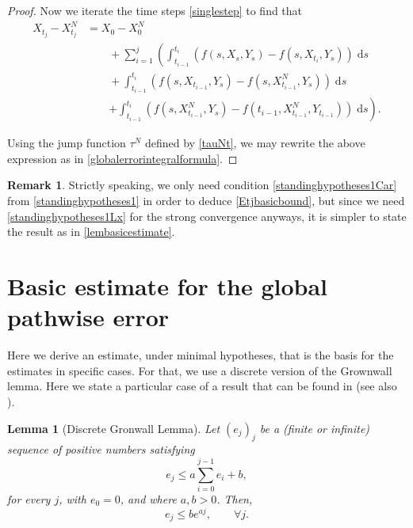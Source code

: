 \documentclass[reqno,12pt]{amsart}
\theoremstyle{plain}%
\newtheorem{lem}{Lemma}[section]
\theoremstyle{definition}
\newtheorem{rmk}{Remark}[section]
\begin{document}
\begin{proof}
    Now we iterate the time steps \eqref{singlestep} to find that
    \begin{align*}
        X_{t_j} - X_{t_j}^N & = X_0 - X_0^N \\
        & \qquad + \sum_{i=1}^{j} \left(\int_{t_{i-1}}^{t_i} \left( f(s, X_s, Y_s) - f(s, X_{t_{i}}, Y_s) \right)\;\mathrm{d}s \right. \\ 
        & \qquad + \int_{t_{i-1}}^{t_i} \left( f(s, X_{t_{i-1}}, Y_s) - f(s, X_{t_{i-1}}^N, Y_s) \right)\;\mathrm{d}s \\
        & \qquad \left. + \int_{t_{i-1}}^{t_i} \left( f(s, X_{t_{i-1}}^N, Y_s) - f(t_{i-1}, X_{t_{i-1}}^N, Y_{t_{i-1}}) \right)\;\mathrm{d}s \right).
    \end{align*}

    Using the jump function $\tau^N$ defined by \eqref{tauNt}, we may rewrite the above expression as in \eqref{globalerrorintegralformula}.
\end{proof}

\begin{rmk}
    Strictly speaking, we only need condition \eqref{standinghypotheses1Car} from \cref{standinghypotheses1} in order to deduce \eqref{Etjbasicbound}, but since we need \eqref{standinghypotheses1Lx} for the strong convergence anyways, it is simpler to state the result as in \cref{lembasicestimate}.
\end{rmk}

\section{Basic estimate for the global pathwise error}

Here we derive an estimate, under minimal hypotheses, that is the basis for the estimates in specific cases. For that, we use a discrete version of the Grownwall lemma. Here we state a particular case of a result that can be found in \cite{GiraultRaviart1981} (see also \cite{Clark1987}).

\begin{lem}[Discrete Gronwall Lemma]
    Let $(e_j)_j$ be a (finite or infinite) sequence of positive numbers satisfying
    \begin{equation}
        \label{integralgronwall}
        e_j \leq a \sum_{i=0}^{j-1} e_i + b,
    \end{equation}
    for every $j$, with $e_0 = 0$, and where $a, b > 0$. Then,
    \begin{equation}
        \label{estimateintegralgronwall}
        e_j \leq b e^{aj}, \qquad \forall j.
    \end{equation}
\end{lem}
\end{document}
